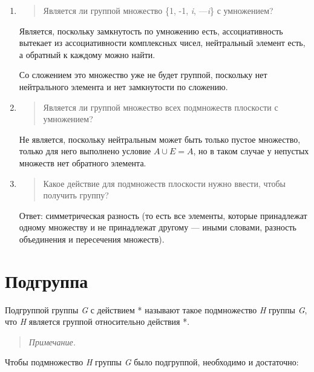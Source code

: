 \documentclass[12pt]{article}
\begin{document}
\begin{enumerate}
    \item
          \begin{quote}
              Является ли группой множество \{1, -1, \emph{i}, ---\emph{i}\} с
              умножением?
          \end{quote}

          Является, поскольку замкнутость по умножению есть, ассоциативность
          вытекает из ассоциативности комплексных чисел, нейтральный элемент есть,
          а обратный к каждому можно найти.

          Со сложением это множество уже не будет группой, поскольку нет
          нейтрального элемента и нет замкнутости по сложению.

    \item
          \begin{quote}
              Является ли группой множество всех подмножеств плоскости с умножением?
          \end{quote}

          Не является, поскольку нейтральным может быть только пустое множество,
          только для него выполнено условие $A \cup E = A$, но в таком случае у
          непустых множеств нет обратного элемента.

    \item
          \begin{quote}
              Какое действие для подмножеств плоскости нужно ввести, чтобы получить
              группу?
          \end{quote}

          Ответ: симметрическая разность (то есть все элементы, которые
          принадлежат одному множеству и не принадлежат другому --- иными словами,
          разность объединения и пересечения множеств).
\end{enumerate}

\section{Подгруппа}

Подгруппой группы \emph{G} с действием * называют такое подмножество
\emph{H} группы \emph{G}, что \emph{H} является группой относительно
действия *.

\begin{quote}
    \emph{Примечание.}
\end{quote}

Чтобы подмножество \emph{H} группы \emph{G} было подгруппой, необходимо
и достаточно:
\end{document}
